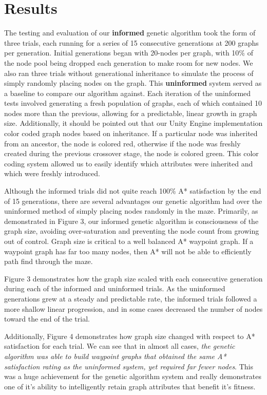 
\section{Results}

	The testing and evaluation of our \textbf{informed} genetic algorithm took the form of three trials, each running for a series of 15 consecutive generations at 200 graphs per generation. Initial generations began with 20-nodes per graph, with 10\% of the node pool being dropped each generation to make room for new nodes. We also ran three trials without generational inheritance to simulate the process of simply randomly placing nodes on the graph. This \textbf{uninformed} system served as a baseline to compare our algorithm against. Each iteration of the uninformed tests involved generating a fresh population of graphs, each of which contained 10 nodes more than the previous, allowing for a predictable, linear growth in graph size. Additionally, it should be pointed out that our Unity Engine implementation color coded graph nodes based on inheritance. If a particular node was inherited from an ancestor, the node is colored red, otherwise if the node was freshly created during the previous crossover stage, the node is colored green. This color coding system allowed us to easily identify which attributes were inherited and which were freshly introduced.
	
	Although the informed trials did not quite reach 100\% A* satisfaction by the end of 15 generations, there are several advantages our genetic algorithm had over the uninformed method of simply placing nodes randomly in the maze. Primarily, as demonstrated in Figure 3, our informed genetic algorithm is consciousness of the graph size, avoiding over-saturation and preventing the node count from growing out of control. Graph size is critical to a well balanced A* waypoint graph. If a waypoint graph has far too many nodes, then A* will not be able to efficiently path find through the maze.
	
	
	Figure 3 demonstrates how the graph size scaled with each consecutive generation during each of the informed and uninformed trials. As the uninformed generations grew at a steady and predictable rate, the informed trials followed a more shallow linear progression, and in some cases decreased the number of nodes toward the end of the trial.
	
	Additionally, Figure 4 demonstrates how graph size changed with respect to A* satisfaction for each trial. We can see that in almost all cases, \textit{the genetic algorithm was able to build waypoint graphs that obtained the same A* satisfaction rating as the uninformed system, yet required far fewer nodes}. This was a huge achievement for the genetic algorithm system and really demonstrates one of it's ability to intelligently retain graph attributes that benefit it's fitness.
	